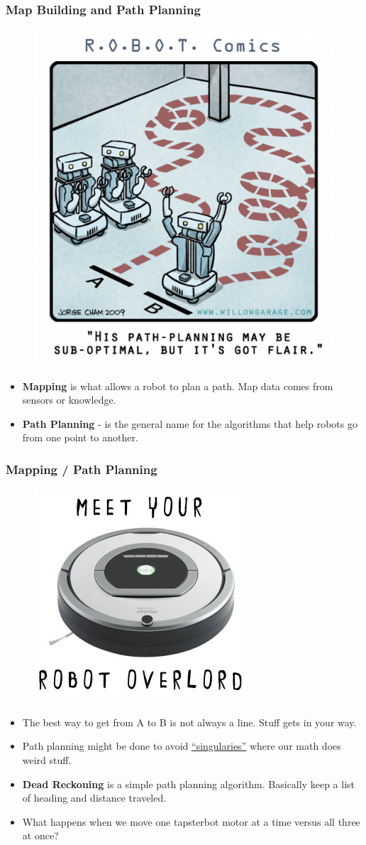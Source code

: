 \documentclass[compress]{beamer}
\begin{document}
\begin{frame}
  \frametitle{Map Building and Path Planning}
  \begin{figure}
     \includegraphics[width=0.4\linewidth]{suboptimal.png}
  \end{figure}
   \begin{itemize}
  \item \textbf{Mapping} is what allows a robot to plan a path. Map data comes from sensors or knowledge. 
   \item \textbf{Path Planning} - is the general name for the algorithms that help robots go from one point to another.

   \end{itemize}     
 \end{frame}
\begin{frame}
  \frametitle{Mapping / Path Planning}
  \begin{figure}
     \includegraphics[width=0.2\linewidth]{overlord.jpg}
  \end{figure}
   \begin{itemize}
   \item The best way to get from A to B is not always a line. Stuff gets in your way.
   \item Path planning might be done to avoid \href{http://vimeo.com/20095999}{``singularies''} where our math does weird stuff.   
   \item \textbf{Dead Reckoning} is a simple path planning algorithm. Basically keep a list of heading and distance traveled. 
   \item What happens when we move one tapsterbot motor at a time versus all three at once? 
   \end{itemize}     
 \end{frame}
\end{document}
